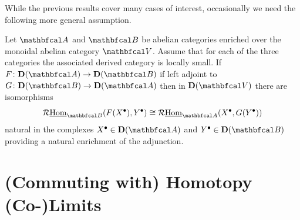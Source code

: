 While the previous results cover many cases of interest, occasionally we need the following more general assumption.
\begin{assumption}
	\label{assumption: derived adjunctions are enriched}
	
	Let $\category{A}$ and $\category{B}$ be abelian categories enriched over the monoidal abelian category $\category{V}$. Assume that for each of the three categories the associated derived category is locally small. If $F\colon \derived{\category{A}} \to \derived{\category{B}}$ if left adjoint to $G\colon \derived{\category{B}}\to\derived{\category{A}}$ then in $\derived{\category{V}}$ there are isomorphisms
		$$\eRHom_\category{B}(F(X^\bullet), Y^\bullet) \cong \eRHom_\category{A}(X^\bullet, G(Y^\bullet))$$
	natural in the complexes $X^\bullet \in \derived{\category{A}}$ and $Y^\bullet \in \derived{\category{B}}$ providing a natural enrichment of the adjunction.
\end{assumption}

\newpage
\section{(Commuting with) Homotopy (Co-)Limits}
 

